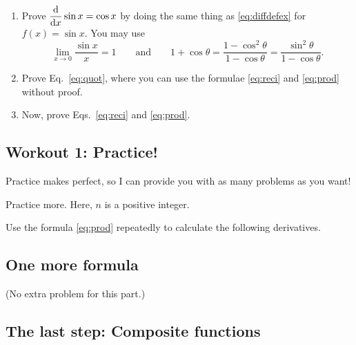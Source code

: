 \documentclass[11pt,pdfa,lastpage]{MishoNote}
\begin{document}
\begin{enumerate}[resume]
 \itemC
\begin{enumerate}
  \item Prove $\displaystyle\diff{}{x}\sin x=\cos x$ by doing the same thing as \eqref{eq:diffdefex} for $f(x)=\sin x$. You may use
\begin{equation*}
  \lim_{x\to 0}\frac{\sin x}{x}=1\qquad\text{and}\qquad1+\cos\theta = \frac{1-\cos^2\theta}{1-\cos\theta} = \frac{\sin^2\theta}{1-\cos\theta}.
\end{equation*}
\smallskip
  \item Prove Eq.~\eqref{eq:quot}, where you can use the formulae \eqref{eq:reci} and \eqref{eq:prod} without proof.
  \item Now, prove Eqs.~\eqref{eq:reci} and \eqref{eq:prod}. 
\end{enumerate} 
\end{enumerate}


\subsection{Workout 1: Practice!}
Practice makes perfect, so I can provide you with as many problems as you want!
\begin{enumerate}[resume]
\itemA Practice more. Here, $n$ is a positive integer.
\begin{menumerate}{3}
\end{menumerate}
\itemB Use the formula \eqref{eq:prod} repeatedly to calculate the following derivatives.
\begin{menumerate}{2}
\end{menumerate}
\end{enumerate}
\subsection{One more formula}
(No extra problem for this part.)

\subsection{The last step: Composite functions}
\end{document}
